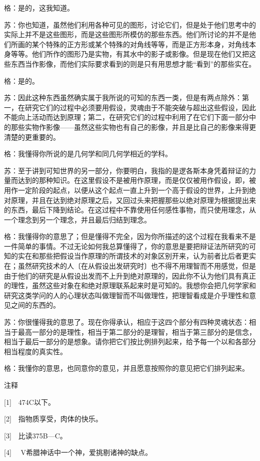 \documentclass[12pt,oneside]{book}
\begin{document}
格：是的，这我知道。

苏：你也知道，虽然他们利用各种可见的图形，讨论它们，但是处于他们思考中的实际上并不是这些图形，而是这些图形所模仿的那些东西。他们所讨论的并不是他们所画的某个特殊的正方形或某个特殊的对角线等等，而是正方形本身，对角线本身等等。他们所作的图形乃是实物，有其水中的影子或影像。但是现在他们又把这些东西当作影像，而他们实际要求看到的则是只有用思想才能“看到”的那些实在。

格：是的。

苏：因此这种东西虽然确实属于我所说的可知的东西一类，但是有两点除外：第一，在研究它们的过程中必须要用假设，灵魂由于不能突破与超出这些假设，因此不能向上活动而达到原理；第二，在研究它们的过程中利用了在它们下面一部分中的那些实物作影像——虽然这些实物也有自己的影像，并且是比自己的影像来得更清楚的更重要的。

格：我懂得你所说的是几何学和同几何学相近的学科。

苏：至于讲到可知世界的另一部分，你要明白，我指的是逻各斯本身凭着辩证的力量而达到的那种知识。在这里假设不是被用作原理，而是仅仅被用作假设，即，被用作一定阶段的起点，以便从这个起点一直上升到一个高于假设的世界，上升到绝对原理，并且在达到绝对原理之后，又回过头来把握那些以绝对原理为根据提出来的东西，最后下降到结论。在这过程中不靠使用任何感性事物，而只使用理念，从一个理念到另一个理念，并且最后归结到理念。

格：我懂得你的意思了；但是懂得不完全，因为你所描述的这个过程在我看来不是一件简单的事情。不过无论如何我总算懂得了，你的意思是要把辩证法所研究的可知的实在和那些把假设当作原理的所谓技术的对象区别开来，认为前者比后者更实在；虽然研究技术的人〔在从假设出发研究时〕也不得不用理智而不用感觉，但是由于他们的研究是从假设出发而不上升到绝对原理的，因此你不认为他们具有真正的理性，虽然这些对象在和绝对原理联系起来时是可知的。我想你会把几何学家和研究这类学问的人的心理状态叫做理智而不叫做理性，把理智看成是介乎理性和意见之间的东西的。

苏：你很懂得我的意思了。现在你得承认，相应于这四个部分有四种灵魂状态：相当于最高一部分的是理性，相当于第二部分的是理智，相当于第三部分的是信念，相当于最后一部分的是想象。请你把它们按比例排列起来，给予每一个以和各部分相当程度的真实性。

格：我懂你的意思，也同意你的意见，并且愿意按照你的意见把它们排列起来。

注释

[1]　474C以下。

[2]　指物质享受，肉体的快乐。

[3]　比读375B—C。

[4]　 V希腊神话中一个神，爱挑剔诸神的缺点。
\end{document}
